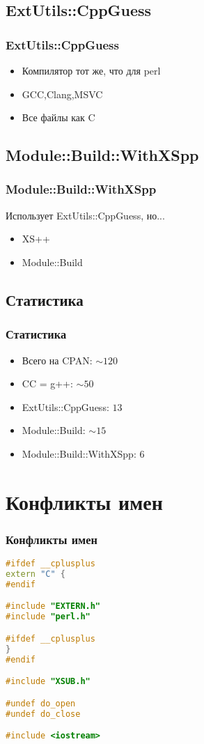 \documentclass[pdflatex,hyperref={unicode=true}]{beamer}
\DeclareRobustCommand{\cpp}{
    \texorpdfstring{\hbox{C\hspace{-0.5ex}\protect\raisebox{0.5ex}{\protect\scalebox{0.67}{++}}}}{C++}
}
\begin{document}
\subsection{ExtUtils::CppGuess}
\begin{frame}[fragile]
    \frametitle{ExtUtils::CppGuess}
    
    \begin{itemize}
        \item Компилятор тот же, что для perl
        \item GCC,Clang,MSVC
        \item Все файлы как \cpp 
    \end{itemize}
\end{frame}

\subsection{Module::Build::WithXSpp}
\begin{frame}
    \frametitle{Module::Build::WithXSpp}
    Использует ExtUtils::CppGuess, но...
    \begin{itemize}
        \item XS++
        \item Module::Build
    \end{itemize}
\end{frame}

\subsection{Статистика}
\begin{frame}
    \frametitle{Статистика}
    \begin{itemize}
        \item Всего на CPAN: $\sim120$
        \item CC = g++: $\sim50$
        \item ExtUtils::CppGuess: $13$
        \item Module::Build: $\sim15$
        \item Module::Build::WithXSpp: $6$
    \end{itemize}
\end{frame}

\section{Конфликты имен}

\begin{frame}[fragile]
    \frametitle{Конфликты имен}
    \begin{lstlisting}[language=C++,style=PerlXS]
#ifdef __cplusplus
extern "C" {
#endif

#include "EXTERN.h"
#include "perl.h"

#ifdef __cplusplus
}
#endif

#include "XSUB.h"

#undef do_open
#undef do_close

#include <iostream>
    \end{lstlisting}
\end{frame}
\end{document}
